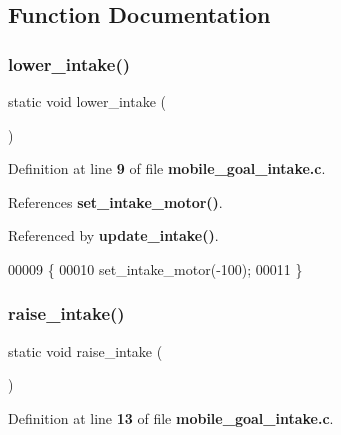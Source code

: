 \subsection{Function Documentation}
\mbox{\label{mobile__goal__intake_8c_afa91470a9891e48827fd62d18553c6ce}} 
\subsubsection{lower\+\_\+intake()}
{\footnotesize\ttfamily static void lower\+\_\+intake (\begin{DoxyParamCaption}{ }\end{DoxyParamCaption})\hspace{0.3cm}{\ttfamily [static]}}



Definition at line \textbf{ 9} of file \textbf{ mobile\+\_\+goal\+\_\+intake.\+c}.



References \textbf{ set\+\_\+intake\+\_\+motor()}.



Referenced by \textbf{ update\+\_\+intake()}.


\begin{DoxyCode}
00009                            \{
00010   set_intake_motor(-100);
00011 \}
\end{DoxyCode}
\mbox{\label{mobile__goal__intake_8c_a4899f9a8621015313e6312ce085da979}} 
\subsubsection{raise\+\_\+intake()}
{\footnotesize\ttfamily static void raise\+\_\+intake (\begin{DoxyParamCaption}{ }\end{DoxyParamCaption})\hspace{0.3cm}{\ttfamily [static]}}



Definition at line \textbf{ 13} of file \textbf{ mobile\+\_\+goal\+\_\+intake.\+c}.




